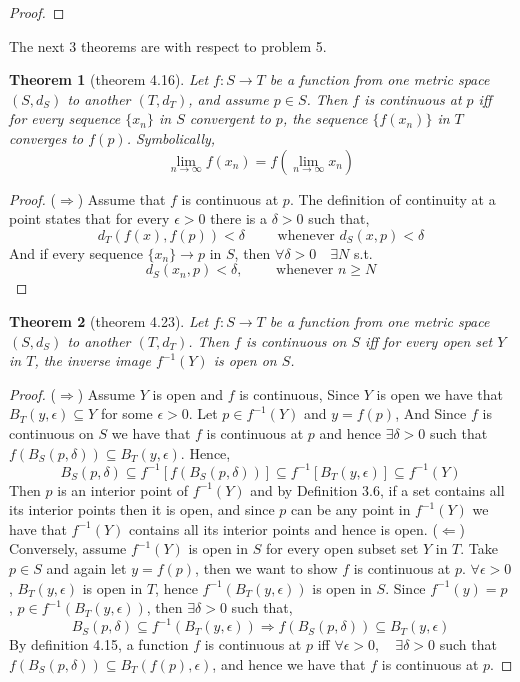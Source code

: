 \documentclass[aps,pra,notitlepage,amsmath,amssymb,letterpaper,12pt]{revtex4-1}
\newtheorem{theorem}{Theorem}
\begin{document}
\begin{proof}
\end{proof}


The next 3 theorems are with respect to problem 5.
\begin{theorem}[theorem 4.16]
Let $f:S \to T$  be a function from one metric space $(S,d_{S})$ to another $(T,d_{T})$, and assume $p \in S$. Then $f$ is continuous at $p$ iff for every sequence $\{x_{n}\}$ in $S$ convergent to $p$, the sequence $\{f(x_{n})\}$ in $T$ converges to $f(p)$. Symbolically,
\[\lim_{n \to \infty} f(x_{n}) = f(\lim_{n \to \infty} x_{n})\]
\end{theorem}
\begin{proof}
($\Longrightarrow$) Assume that $f$ is continuous at $p$. The definition of continuity at a point states that for every $\epsilon > 0$ there is a $\delta >0$ such that,
\[d_{T}(f(x),f(p)) < \delta \qquad \textrm{  whenever  } d_{S}(x,p) < \delta\]
And if every sequence $\{x_{n}\} \rightarrow p$ in $S$, then  $\forall \delta > 0 \quad \exists N$ s.t. $$d_{S}(x_{n},p) < \delta, \qquad \textrm{ whenever } n \geq N$$
\end{proof}

\begin{theorem}[theorem 4.23]
Let $f:S \to T$  be a function from one metric space $(S,d_{S})$ to another $(T,d_{T})$. Then $f$ is continuous on $S$ iff for every open set $Y$ in $T$, the inverse image $f^{-1}(Y)$ is open on $S$.
\end{theorem}
\begin{proof}
($\Longrightarrow$) Assume $Y$ is open and $f$ is continuous, Since $Y$ is open we have that $B_{T}(y,\epsilon) \subseteq Y$ for some $\epsilon > 0$. Let $p \in f^{-1}(Y)$ and $y=f(p)$, And Since $f$ is continuous on $S$ we have that $f$ is continuous at $p$ and hence $\exists \delta > 0$ such that  $f(B_{S}(p,\delta)) \subseteq B_{T}(y,\epsilon)$. Hence,
\[B_{S}(p,\delta) \subseteq f^{-1}[f(B_{S}(p,\delta))] \subseteq f^{-1}[B_{T}(y,\epsilon)] \subseteq f^{-1}(Y)\]
Then $p$ is an interior point of $f^{-1}(Y)$ and by Definition 3.6, if a set contains all its interior points then it is open, and since $p$ can be any point in $f^{-1}(Y)$ we have that $f^{-1}(Y)$ contains all its interior points and hence is open.
\newline{}
($\Longleftarrow$) Conversely, assume $f^{-1}(Y)$ is open in $S$ for every open subset set $Y$ in $T$. Take $p \in S$ and again let $y=f(p)$, then we want to show $f$ is continuous at $p$. $\forall \epsilon > 0$, $B_{T}(y,\epsilon)$ is open in $T$, hence $f^{-1}(B_{T}(y,\epsilon))$ is open in $S$. Since $f^{-1}(y) = p$ ,  $p \in f^{-1}(B_{T}(y,\epsilon))$, then $\exists \delta > 0$ such that,
\[B_{S}(p,\delta) \subseteq f^{-1}(B_{T}(y,\epsilon)) \Rightarrow f(B_{S}(p,\delta)) \subseteq B_{T}(y,\epsilon)\]
By definition 4.15, a function $f$ is continuous at $p$ iff $\forall \epsilon > 0, \quad \exists \delta > 0$ such that $ f(B_{S}(p,\delta)) \subseteq B_{T}(f(p),\epsilon)$, and hence we have that $f$ is continuous at $p$.
\end{proof}
\end{document}
